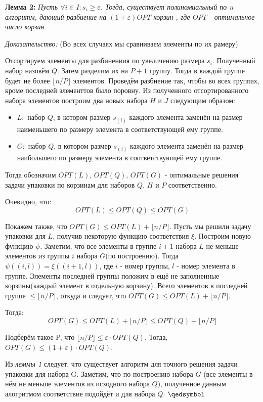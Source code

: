 \documentclass[a4paper,14pt,russian]{article}
\begin{document}
{\bf Лемма 2:} \textit{Пусть $\forall i \in I: s_i \geq \varepsilon$. Тогда, существует полиномиальный по n алгоритм, дающий разбиение на $(1 + \varepsilon)OPT$ корзин , где $OPT$ - оптимальное число корзин}

\textit{Доказательство:} (Во всех случаях мы сравниваем элементы по их рамеру)

Отсортируем элементы для разбинениия по увеличению размера $s_i$. Полученный набор назовём $Q$. Затем разделим их на $P + 1$ группу. Тогда в каждой группе будет не более $\lfloor{n/P\rfloor}$ элементов. Проведём разбиение так, чтобы во всех группах, кроме последней элементтов было поровну. Из полученного отсортированного набора элементов построим два новых набора $H$ и $J$ следующим образом: 

\begin{itemize}
  \item $L:$ набор $Q$, в котором размер $s_{(i)}$ каждого элемента заменён на размер наименьшего по размеру элемента в соответствующей ему группе.
  \item $G:$ набор $Q$, в котором размер $s_{(i)}$ каждого элемента заменён на размер наибольшего по размеру элемента в соответствующей ему группе.
\end{itemize}

Тогда обозначим $OPT(L)$, $OPT(Q)$, $OPT(G)$ - оптимальные решения задачи упаковки по корзинам для наборов $Q$, $H$ и $P$ соответственно.

Очевидно, что:
$$OPT(L) \leq OPT(Q) \leq OPT(G)$$

Покажем также, что $OPT(G) \leq OPT(L) + \lfloor{n/P\rfloor}$. Пусть мы решили задачу упаковки для $L$, получив некоторую функцию соответствия $\xi$. Построим новую функцию $\psi$. Заметим, что все элементы в группе $i+1$ набора $L$ не меньше элементов из группы $i$ набора $G$(по построению). Тогда $\psi((i, l)) = \xi((i+1, l))$, где $i$ - номер группы, $l$ - номер элемента в группе. Элементы последней группы положим в ещё не заполненные корзины(каждый элемент в отдельную корзину). Всего элементов в последней группе $\leq \lfloor{n/P\rfloor}$, откуда и следует, что $OPT(G) \leq OPT(L) + \lfloor{n/P\rfloor}$.

Тогда:
$$ OPT(G) \leq OPT(L) + \lfloor{n/P\rfloor} \leq OPT(Q) + \lfloor{n/P\rfloor}$$

Подберём такое P, что $\lfloor{n/P\rfloor} \leq \varepsilon \cdot OPT(Q)$.
Тогда, $OPT(G) \leq (1 + \varepsilon) \cdot OPT(Q)$. 

Из \textit{леммы 1} следует, что существует алгоритм для точного решения задачи упаковки для набора G. Заметим, что по построению набора $G$ (все элементы в нём не меньше элементов из исходного набора $Q$), полученное данным алогритмом соответствие подойдёт и для набора $Q$.
$\qedsymbol$
\end{document}
